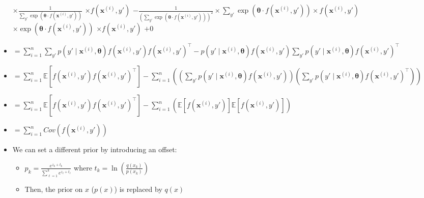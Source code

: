 \begin{itemize}
    $\times \frac{1}{\sum_{y'} \exp(\boldsymbol{\theta} \cdot f(\boldsymbol{x}^{(i)}, y'))}$
    $\times f(\boldsymbol{x}^{(i)}, y')$
    $- \frac{1}{(\sum_{y'} \exp(\boldsymbol{\theta} \cdot f(\boldsymbol{x}^{(i)}, y')))^2} \times \sum_{y'} \exp(\boldsymbol{\theta} \cdot f(\boldsymbol{x}^{(i)}, y')) \times f(\boldsymbol{x}^{(i)}, y')$
    $\times \exp(\boldsymbol{\theta} \cdot f(\boldsymbol{x}^{(i)}, y'))$
    $\times f(\boldsymbol{x}^{(i)}, y')$
    $+0$
    \item $ = \sum_{i=1}^n \sum_{y'} p(y' \mid \boldsymbol{x}^{(i)}, \boldsymbol{\theta}) f(\boldsymbol{x}^{(i)}, y') f(\boldsymbol{x}^{(i)}, y')^\intercal - p(y' \mid \boldsymbol{x}^{(i)}, \boldsymbol{\theta}) f(\boldsymbol{x}^{(i)}, y') \sum_{y'} p(y' \mid \boldsymbol{x}^{(i)}, \boldsymbol{\theta}) f(\boldsymbol{x}^{(i)}, y')^\intercal$
    \item $ = \sum_{i=1}^n \mathbb{E}[f(\boldsymbol{x}^{(i)}, y') f(\boldsymbol{x}^{(i)}, y')^\intercal] - \sum_{i=1}^n\left( (\sum_{y'} p(y' \mid \boldsymbol{x}^{(i)}, \boldsymbol{\theta}) f(\boldsymbol{x}^{(i)}, y')) (\sum_{y'} p(y' \mid \boldsymbol{x}^{(i)}, \boldsymbol{\theta}) f(\boldsymbol{x}^{(i)}, y')^\intercal) \right)$
    \item $ = \sum_{i=1}^n \mathbb{E}[f(\boldsymbol{x}^{(i)}, y') f(\boldsymbol{x}^{(i)}, y')^\intercal] - \sum_{i=1}^n\left( \mathbb{E}[f(\boldsymbol{x}^{(i)}, y')] \mathbb{E}[f(\boldsymbol{x}^{(i)}, y')] \right)$
    \item $= \sum_{i=1}^n Cov(f(\boldsymbol{x}^{(i)}, y'))$
    \item We can set a different prior by introducing an offset:
    \begin{itemize}
        \item $
        p_k = \frac{e^{z_k + t_k}}{\sum_{\ell=1}^k e^{z_\ell + t_\ell}}
        $ where $t_k = \ln(\frac{q(x_k)}{p(x_k)})$
        \item Then, the prior on $x$ ($p(x)$) is replaced by $q(x)$
    \end{itemize}
\end{itemize}